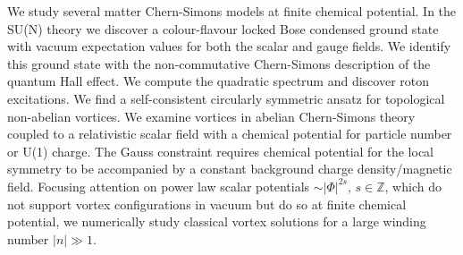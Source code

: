 


\begin{abstracts}        %

\begin{singlespace}
    We study several matter Chern-Simons models at finite chemical potential. In the SU(N) theory we discover a colour-flavour locked Bose condensed ground state with vacuum expectation values for both the scalar and gauge fields. We identify this ground state with the non-commutative Chern-Simons description of the quantum Hall effect. We compute the quadratic spectrum and discover roton excitations. We find a self-consistent circularly symmetric ansatz for topological non-abelian vortices. We examine vortices in abelian Chern-Simons theory coupled to a relativistic scalar field with a chemical potential for particle number or U(1) charge. The Gauss constraint requires chemical potential for the local symmetry to be accompanied by a constant background charge density/magnetic field. Focusing attention on power law scalar potentials $∼ |\Phi|^{2s}, \, s\in \mathbb{Z}$, which do not support vortex configurations in vacuum but do so at finite chemical potential, we numerically study classical vortex solutions for a large winding number $|n|\gg 1$.
\end{singlespace}

\end{abstracts}


